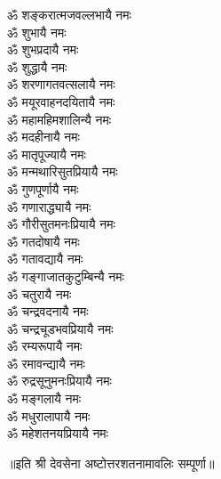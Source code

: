 \begin{flushleft}
\begin{multicols}{2}
ॐ शङ्करात्मजवल्लभायै नमः\\
ॐ शुभायै नमः\\
ॐ शुभप्रदायै नमः\\
ॐ शुद्धायै नमः\\
ॐ शरणागतवत्सलायै नमः\\
ॐ मयूरवाहनदयितायै नमः\\
ॐ महामहिमशालिन्यै नमः\hfill{}\\
ॐ मदहीनायै नमः\\
ॐ मातृपूज्यायै नमः\\
ॐ मन्मथारिसुतप्रियायै नमः\\
ॐ गुणपूर्णायै नमः\\
ॐ गणाराद्ध्यायै नमः\\
ॐ गौरीसुतमनःप्रियायै नमः\\
ॐ गतदोषायै नमः\\
ॐ गतावद्यायै नमः\\
ॐ गङ्गाजातकुटुम्बिन्यै नमः\\
ॐ चतुरायै नमः\hfill{}\\
ॐ चन्द्रवदनायै नमः\\
ॐ चन्द्रचूडभवप्रियायै नमः\\
ॐ रम्यरूपायै नमः\\
ॐ रमावन्द्यायै नमः\\
ॐ रुद्रसूनुमनःप्रियायै नमः\\
ॐ मङ्गलायै नमः\\
ॐ मधुरालापायै नमः\\
ॐ महेशतनयप्रियायै नमः\\
\end{multicols}
\end{flushleft}
\centerline{॥इति श्री देवसेना अष्टोत्तरशतनामावलिः सम्पूर्णा॥}
